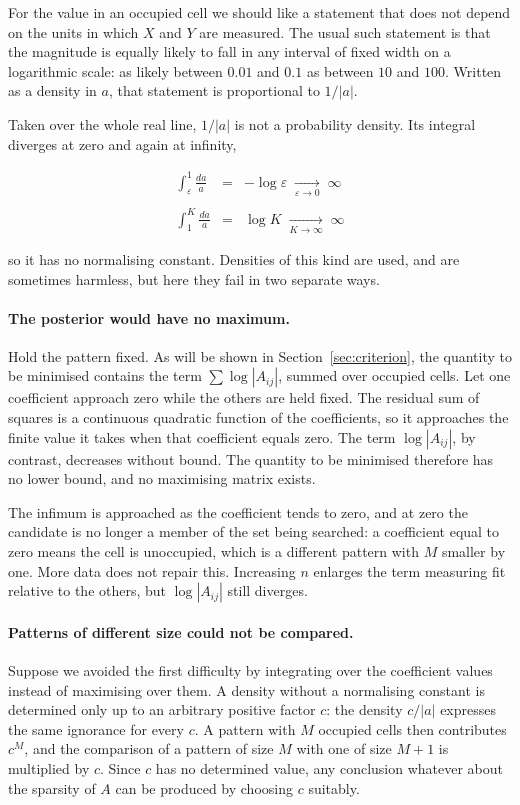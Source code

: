 For the value in an occupied cell we should like a statement that does not depend on
the units in which $X$ and $Y$ are measured. The usual such statement is that the
magnitude is equally likely to fall in any interval of fixed width on a logarithmic
scale: as likely between $0.01$ and $0.1$ as between $10$ and $100$. Written as a
density in $a$, that statement is proportional to $1/|a|$.

Taken over the whole real line, $1/|a|$ is not a probability density. Its integral
diverges at zero and again at infinity,

\begin{eqnarray}
\int_{\varepsilon}^{1} \frac{da}{a} &=& -\log \varepsilon
\;\xrightarrow[\varepsilon \to 0]{}\; \infty
\label{eq:diverge_A}
\\ \nonumber
\\
\int_{1}^{K} \frac{da}{a} &=& \log K
\;\xrightarrow[K \to \infty]{}\; \infty
\label{eq:diverge_B}
\end{eqnarray}

so it has no normalising constant. Densities of this kind are used, and are
sometimes harmless, but here they fail in two separate ways.

\paragraph{The posterior would have no maximum.}
Hold the pattern fixed. As will be shown in Section~\ref{sec:criterion}, the quantity
to be minimised contains the term $\sum \log|A_{ij}|$, summed over occupied cells.
Let one coefficient approach zero while the others are held fixed. The residual sum
of squares is a continuous quadratic function of the coefficients, so it approaches
the finite value it takes when that coefficient equals zero. The term $\log|A_{ij}|$,
by contrast, decreases without bound. The quantity to be minimised therefore has no
lower bound, and no maximising matrix exists.

The infimum is approached as the coefficient tends to zero, and at zero the candidate
is no longer a member of the set being searched: a coefficient equal to zero means
the cell is unoccupied, which is a different pattern with $M$ smaller by one. More
data does not repair this. Increasing $n$ enlarges the term measuring fit relative to
the others, but $\log|A_{ij}|$ still diverges.

\paragraph{Patterns of different size could not be compared.}
Suppose we avoided the first difficulty by integrating over the coefficient values
instead of maximising over them. A density without a normalising constant is
determined only up to an arbitrary positive factor $c$: the density $c/|a|$ expresses
the same ignorance for every $c$. A pattern with $M$ occupied cells then contributes
$c^{M}$, and the comparison of a pattern of size $M$ with one of size $M+1$ is
multiplied by $c$. Since $c$ has no determined value, any conclusion whatever about
the sparsity of $A$ can be produced by choosing $c$ suitably.

